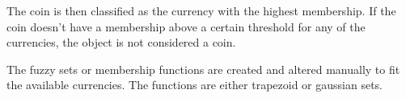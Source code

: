 \documentclass[report.tex]{subfile}
\begin{document}
The coin is then classified as the currency with the highest membership. If the
coin doesn't have a membership above a certain threshold for any of the
currencies, the object is not considered a coin.

The fuzzy sets or membership functions are created and altered manually to fit
the available currencies. The functions are either trapezoid or gaussian sets.
\end{document}
